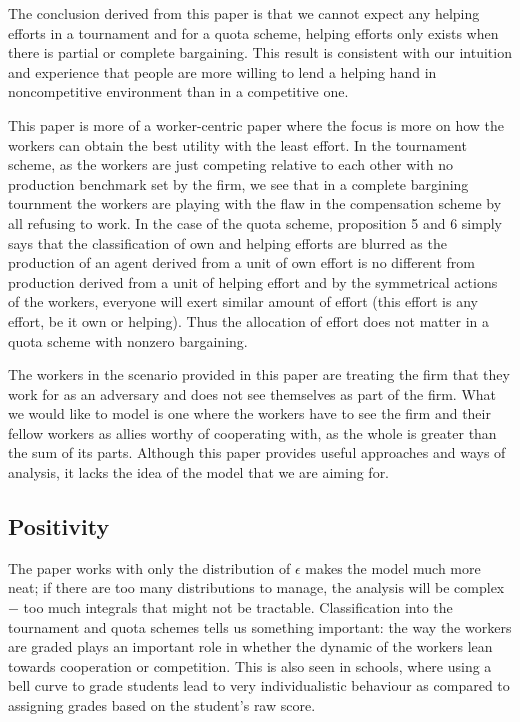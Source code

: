 \documentclass[a4paper,10pt]{article}
\theoremstyle{definition}
\begin{document}
The conclusion derived from this paper is that we cannot expect any helping efforts in a tournament and for a quota scheme, helping efforts only exists when there is partial or complete bargaining. This result is consistent with our intuition and experience that people are more willing to lend a helping hand in noncompetitive environment than in a competitive one.


This paper is more of a worker-centric paper where the focus is more on how the workers can obtain the best utility with the least effort. In the tournament scheme, as the workers are just competing relative to each other with no production benchmark set by the firm, we see that in a complete bargining tournment the workers are playing with the flaw in the compensation scheme by all refusing to work. In the case of the quota scheme, proposition 5 and 6 simply says that the classification of own and helping efforts are blurred as the production of an agent derived from a unit of own effort is no different from production derived from a unit of helping effort and by the symmetrical actions of the workers, everyone will exert similar amount of effort (this effort is any effort, be it own or helping). Thus the allocation of effort does not matter in a quota scheme with nonzero bargaining. 

The workers in the scenario provided in this paper are treating the firm that they work for as an adversary and does not see themselves as part of the firm. What we would like to model is one where the workers have to see the firm and their fellow workers as allies worthy of cooperating with, as the whole is greater than the sum of its parts. Although this paper provides useful approaches and ways of analysis, it lacks the idea of the model that we are aiming for.

 


\subsection*{Positivity}

The paper works with only the distribution of $\epsilon$ makes the model much more neat; if there are too many distributions to manage, the analysis will be complex $-$ too much integrals that might not be tractable. Classification into the tournament and quota schemes tells us something important: the way the workers are graded plays an important role in whether the dynamic of the workers lean towards cooperation or competition. This is also seen in schools, where using a bell curve to grade students lead to very individualistic behaviour as compared to assigning grades based on the student's raw score. 
\end{document}
